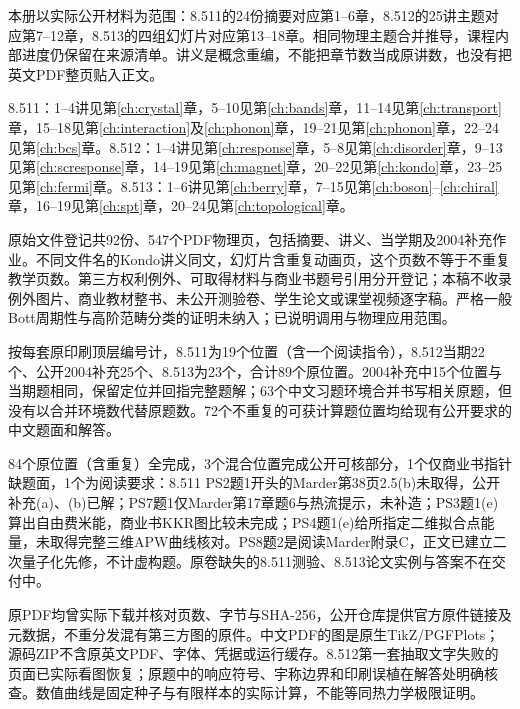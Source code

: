本册以实际公开材料为范围：8.511的24份摘要对应第1--6章，8.512的25讲主题对应第7--12章，8.513的四组幻灯片对应第13--18章。相同物理主题合并推导，课程内部进度仍保留在来源清单。讲义是概念重编，不能把章节数当成原讲数，也没有把英文PDF整页贴入正文。

8.511：1--4讲见第\ref{ch:crystal}章，5--10见第\ref{ch:bands}章，11--14见第\ref{ch:transport}章，15--18见第\ref{ch:interaction}及\ref{ch:phonon}章，19--21见第\ref{ch:phonon}章，22--24见第\ref{ch:bcs}章。8.512：1--4讲见第\ref{ch:response}章，5--8见第\ref{ch:disorder}章，9--13见第\ref{ch:scresponse}章，14--19见第\ref{ch:magnet}章，20--22见第\ref{ch:kondo}章，23--25见第\ref{ch:fermi}章。8.513：1--6讲见第\ref{ch:berry}章，7--15见第\ref{ch:boson}--\ref{ch:chiral}章，16--19见第\ref{ch:spt}章，20--24见第\ref{ch:topological}章。

原始文件登记共92份、547个PDF物理页，包括摘要、讲义、当学期及2004补充作业。不同文件名的Kondo讲义同文，幻灯片含重复动画页，这个页数不等于不重复教学页数。第三方权利例外、可取得材料与商业书题号引用分开登记；本稿不收录例外图片、商业教材整书、未公开测验卷、学生论文或课堂视频逐字稿。严格一般Bott周期性与高阶范畴分类的证明未纳入；已说明调用与物理应用范围。


按每套原印刷顶层编号计，8.511为19个位置（含一个阅读指令），8.512当期22个、公开2004补充25个、8.513为23个，合计89个原位置。2004补充中15个位置与当期题相同，保留定位并回指完整题解；63个中文习题环境合并书写相关原题，但没有以合并环境数代替原题数。72个不重复的可获计算题位置均给现有公开要求的中文题面和解答。

84个原位置（含重复）全完成，3个混合位置完成公开可核部分，1个仅商业书指针缺题面，1个为阅读要求：8.511 PS2题1开头的Marder第38页2.5(b)未取得，公开补充(a)、(b)已解；PS7题1仅Marder第17章题6与热流提示，未补造；PS3题1(e)算出自由费米能，商业书KKR图比较未完成；PS4题1(e)给所指定二维拟合点能量，未取得完整三维APW曲线核对。PS8题2是阅读Marder附录C，正文已建立二次量子化先修，不计虚构题。原卷缺失的8.511测验、8.513论文实例与答案不在交付中。

原PDF均曾实际下载并核对页数、字节与SHA-256，公开仓库提供官方原件链接及元数据，不重分发混有第三方图的原件。中文PDF的图是原生TikZ/PGFPlots；源码ZIP不含原英文PDF、字体、凭据或运行缓存。8.512第一套抽取文字失败的页面已实际看图恢复；原题中的响应符号、宇称边界和印刷误植在解答处明确核查。数值曲线是固定种子与有限样本的实际计算，不能等同热力学极限证明。

